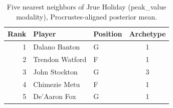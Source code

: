 \begin{table}[htbp]
  \centering\small
  \begin{tabular}{rllc}
    \toprule
    Rank & Player & Position & Archetype \\
    \midrule
    1 & Dalano Banton & G & 1 \\
    2 & Trendon Watford & F & 1 \\
    3 & John Stockton & G & 3 \\
    4 & Chimezie Metu & F & 1 \\
    5 & De'Aaron Fox & G & 1 \\
    \bottomrule
  \end{tabular}
  \caption{Five nearest neighbors of Jrue Holiday (peak_value modality), Procrustes-aligned posterior mean.}
  \label{tab:Jrue_Holiday_neighbors_peak_value}
\end{table}

